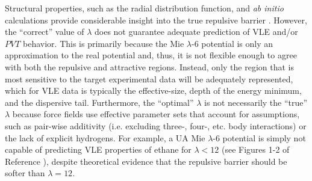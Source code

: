 \documentclass[preprint,letterpaper,floatfix,citeautoscript,aip,jcp]{revtex4-1}
\begin{document}
Structural properties, such as the radial distribution function, and \textit{ab initio} calculations provide considerable insight into the true repulsive barrier \cite{Kulakova2017,Galliero2005}. However, the ``correct'' value of $\lambda$ does not guarantee adequate prediction of VLE and/or $PVT$ behavior. This is primarily because the Mie $\lambda$-6 potential is only an approximation to the real potential and, thus, it is not flexible enough to agree with both the repulsive and attractive regions. Instead, only the region that is most sensitive to the target experimental data will be adequately represented, which for VLE data is typically the effective-size, depth of the energy minimum, and the dispersive tail. Furthermore, the ``optimal'' $\lambda$ is not necessarily the ``true'' $\lambda$ because force fields use effective parameter sets that account for assumptions, such as pair-wise additivity (i.e. excluding three-, four-, etc. body interactions) or the lack of explicit hydrogens. For example, a UA Mie $\lambda$-6 potential is simply not capable of predicting VLE properties of ethane for $\lambda < 12$ (see Figures 1-2 of Reference ), despite theoretical evidence that the repulsive barrier should be softer than $\lambda = 12$.





\end{document}
